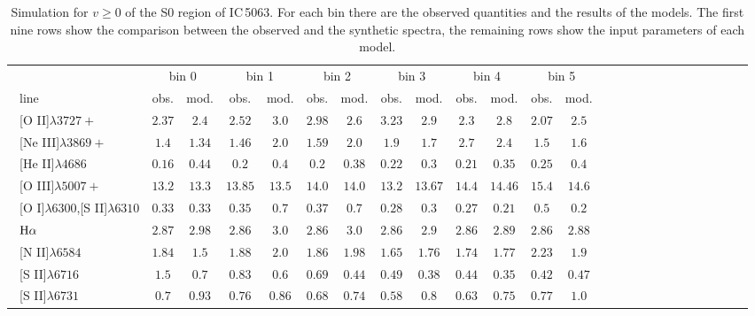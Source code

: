 \documentclass[../thesis.tex]{subfiles}
\begin{document}
\begin{landscape}
\begin{table}

\centering
\caption{Simulation for $v \ge 0$ of the S0 region of IC\,5063. For each bin there are the observed quantities and the results of the models. The first nine rows show the comparison between the observed and the synthetic spectra, the remaining rows show the input parameters of each model.}
\label{tab:sim_s0+}


\small{
\begin{tabular}{lcccccccccccccccccccccccc}
 \hline 
 \ &\multicolumn{2}{c}{bin 0} &\multicolumn{2}{c}{bin 1}&\multicolumn{2}{c}{bin 2}&\multicolumn{2}{c}{bin 3}&\multicolumn{2}{c}{bin 4}&\multicolumn{2}{c}{bin 5}\\
\   line              &obs.  &mod.  & obs. & mod. &obs. &mod.  &obs.  &mod. &obs. &mod.  &obs.  &mod. \\ 
\hline
\ [O II]$\lambda3727+ $         &$2.37  $&$2.4   $&$2.52   $&$ 3.0  $&$2.98 $&$2.6   $&$3.23  $&$2.9  $&$2.3   $&$2.8   $&$2.07  $&$2.5   $\\            
\ [Ne III]$\lambda3869+ $       &$1.4   $&$1.34  $&$1.46   $&$ 2.0  $&$1.59 $&$2.0   $&$1.9   $&$1.7   $&$2.7   $&$2.4   $&$1.5   $&$1.6   $\\            
\ [He II]$\lambda4686$           &$0.16  $&$0.44  $&$0.2    $&$ 0.4  $&$0.2  $&$0.38  $&$0.22  $&$0.3   $&$0.21  $&$0.35  $&$0.25  $&$0.4  $\\            
\ [O III]$\lambda5007+ $        &$13.2  $&$13.3  $&$13.85  $&$ 13.5 $&$14.0 $&$14.0  $&$13.2  $&$13.67 $&$ 14.4 $&$ 14.46$&$15.4  $&$14.6 $\\            
\ [O I]$\lambda6300$,[S II]$\lambda6310$  &$0.33  $&$0.33  $&$0.35   $&$0.7   $&$0.37 $&$0.7   $&$0.28  $&$0.3   $&$0.27  $&$0.21  $&$0.5   $&$0.2  $\\            
\ $\rm H\alpha$                 &$2.87  $&$2.98  $&$2.86   $&$ 3.0  $&$2.86 $&$3.0   $&$2.86  $&$2.9   $&$2.86  $&$2.89  $&$2.86  $&$2.88 $\\            
\ [N II]$\lambda6584$           &$1.84  $&$1.5   $&$1.88   $&$ 2.0  $&$1.86 $&$1.98  $&$1.65  $&$1.76  $&$1.74  $&$1.77  $&$2.23  $&$1.9  $\\            
\ [S II]$\lambda6716$           &$1.5   $&$0.7   $&$0.83   $&$ 0.6  $&$0.69 $&$0.44  $&$0.49  $&$0.38  $&$0.44  $&$0.35  $&$0.42  $&$0.47 $\\            
\ [S II]$\lambda6731$            &$0.7   $&$0.93  $&$0.76   $&$ 0.86 $&$0.68 $&$0.74  $&$0.58  $&$0.8   $&$0.63  $&$0.75  $&$0.77  $&$1.0  $\\            

\end{tabular}}
\end{table}
\end{landscape}
\end{document}
